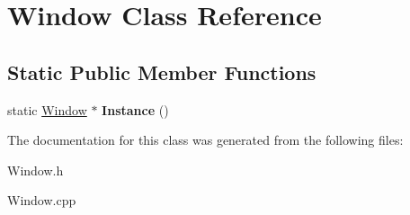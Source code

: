 \hypertarget{class_window}{\section{Window Class Reference}
\label{class_window}
}
\subsection*{Static Public Member Functions}
\begin{DoxyCompactItemize}
\item 
\hypertarget{class_window_a3d88ccfd9c67c5b1cf558970d9005997}{static \hyperlink{class_window}{Window} $\ast$ {\bfseries Instance} ()}\label{class_window_a3d88ccfd9c67c5b1cf558970d9005997}

\end{DoxyCompactItemize}


The documentation for this class was generated from the following files\-:\begin{DoxyCompactItemize}
\item 
Window.\-h\item 
Window.\-cpp\end{DoxyCompactItemize}
